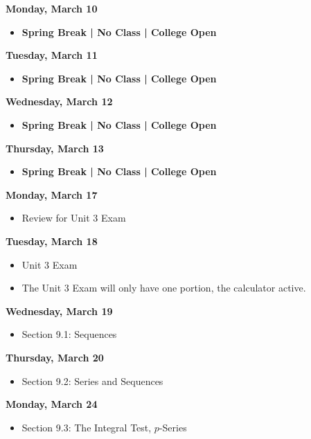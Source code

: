 \documentclass[11pt]{article}
\begin{document}
\textbf{Monday, March 10}

\begin{itemize}
\item \textbf{Spring Break | No Class | College Open}
\end{itemize}

\textbf{Tuesday, March 11}

\begin{itemize}
\item \textbf{Spring Break | No Class | College Open}
\end{itemize}

\textbf{Wednesday, March 12}

\begin{itemize}
\item \textbf{Spring Break | No Class | College Open}
\end{itemize}

\textbf{Thursday, March 13}

\begin{itemize}
\item \textbf{Spring Break | No Class | College Open}
\end{itemize}

\textbf{Monday, March 17}

\begin{itemize}
\item Review for Unit 3 Exam
\end{itemize}

\textbf{Tuesday, March 18}

\begin{itemize}
\item Unit 3 Exam
\item The Unit 3 Exam will only have one portion, the calculator active.
\end{itemize}

\textbf{Wednesday, March 19}

\begin{itemize}
\item Section 9.1: Sequences
\end{itemize}

\textbf{Thursday, March 20}

\begin{itemize}
\item Section 9.2: Series and Sequences
\end{itemize}

\textbf{Monday, March 24}

\begin{itemize}
\item Section 9.3: The Integral Test, $p$-Series
\end{itemize}
\end{document}

